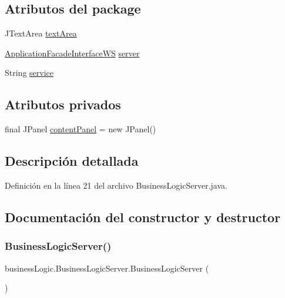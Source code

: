 \subsection*{Atributos del \textquotesingle{}package\textquotesingle{}}
\begin{DoxyCompactItemize}
\item 
J\+Text\+Area \mbox{\hyperlink{classbusiness_logic_1_1_business_logic_server_aec137250843e53f480cd28952ca4afd7}{text\+Area}}
\item 
\mbox{\hyperlink{interfacebusiness_logic_1_1_application_facade_interface_w_s}{Application\+Facade\+Interface\+WS}} \mbox{\hyperlink{classbusiness_logic_1_1_business_logic_server_ad1b90ed3ddcce431e7b064bb4a4631ed}{server}}
\item 
String \mbox{\hyperlink{classbusiness_logic_1_1_business_logic_server_a474037df64d451baf01fcb6f582cde2a}{service}}
\end{DoxyCompactItemize}
\subsection*{Atributos privados}
\begin{DoxyCompactItemize}
\item 
final J\+Panel \mbox{\hyperlink{classbusiness_logic_1_1_business_logic_server_a0893f28ccaea8b86f7fe942c6ea3e126}{content\+Panel}} = new J\+Panel()
\end{DoxyCompactItemize}


\subsection{Descripción detallada}


Definición en la línea 21 del archivo Business\+Logic\+Server.\+java.



\subsection{Documentación del constructor y destructor}
\mbox{\label{classbusiness_logic_1_1_business_logic_server_a45e022d6b8b68567423caab4157e2784}} 
\subsubsection{\texorpdfstring{BusinessLogicServer()}{BusinessLogicServer()}}
{\footnotesize\ttfamily business\+Logic.\+Business\+Logic\+Server.\+Business\+Logic\+Server (\begin{DoxyParamCaption}{ }\end{DoxyParamCaption})}



